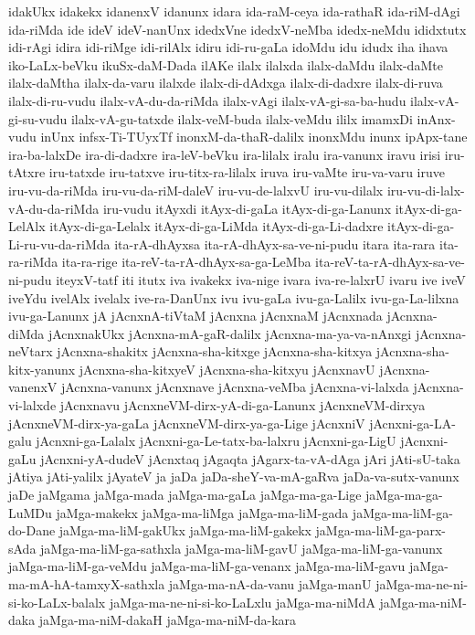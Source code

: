 {idakUkx
idakekx
idanenxV
idanunx
idara
ida-raM-ceya
ida-rathaR
ida-riM-dAgi
ida-riMda
ide
ideV
ideV-nanUnx
idedxVne
idedxV-neMba
idedx-neMdu
ididxtutx
idi-rAgi
idira
idi-riMge
idi-rilAlx
idiru
idi-ru-gaLa
idoMdu
idu
idudx
iha
ihava
iko-LaLx-beVku
ikuSx-daM-Dada
ilAKe
ilalx
ilalxda
ilalx-daMdu
ilalx-daMte
ilalx-daMtha
ilalx-da-varu
ilalxde
ilalx-di-dAdxga
ilalx-di-dadxre
ilalx-di-ruva
ilalx-di-ru-vudu
ilalx-vA-du-da-riMda
ilalx-vAgi
ilalx-vA-gi-sa-ba-hudu
ilalx-vA-gi-su-vudu
ilalx-vA-gu-tatxde
ilalx-veM-buda
ilalx-veMdu
ililx
imamxDi
inAnx-vudu
inUnx
infsx-Ti-TUyxTf
inonxM-da-thaR-dalilx
inonxMdu
inunx
ipApx-tane
ira-ba-lalxDe
ira-di-dadxre
ira-leV-beVku
ira-lilalx
iralu
ira-vanunx
iravu
irisi
iru-tAtxre
iru-tatxde
iru-tatxve
iru-titx-ra-lilalx
iruva
iru-vaMte
iru-va-varu
iruve
iru-vu-da-riMda
iru-vu-da-riM-daleV
iru-vu-de-lalxvU
iru-vu-dilalx
iru-vu-di-lalx-vA-du-da-riMda
iru-vudu
itAyxdi
itAyx-di-gaLa
itAyx-di-ga-Lanunx
itAyx-di-ga-LelAlx
itAyx-di-ga-Lelalx
itAyx-di-ga-LiMda
itAyx-di-ga-Li-dadxre
itAyx-di-ga-Li-ru-vu-da-riMda
ita-rA-dhAyxsa
ita-rA-dhAyx-sa-ve-ni-pudu
itara
ita-rara
ita-ra-riMda
ita-ra-rige
ita-reV-ta-rA-dhAyx-sa-ga-LeMba
ita-reV-ta-rA-dhAyx-sa-ve-ni-pudu
iteyxV-tatf
iti
itutx
iva
ivakekx
iva-nige
ivara
iva-re-lalxrU
ivaru
ive
iveV
iveYdu
ivelAlx
ivelalx
ive-ra-DanUnx
ivu
ivu-gaLa
ivu-ga-Lalilx
ivu-ga-La-lilxna
ivu-ga-Lanunx
jA
jAcnxnA-tiVtaM
jAcnxna
jAcnxnaM
jAcnxnada
jAcnxna-diMda
jAcnxnakUkx
jAcnxna-mA-gaR-dalilx
jAcnxna-ma-ya-va-nAnxgi
jAcnxna-neVtarx
jAcnxna-shakitx
jAcnxna-sha-kitxge
jAcnxna-sha-kitxya
jAcnxna-sha-kitx-yanunx
jAcnxna-sha-kitxyeV
jAcnxna-sha-kitxyu
jAcnxnavU
jAcnxna-vanenxV
jAcnxna-vanunx
jAcnxnave
jAcnxna-veMba
jAcnxna-vi-lalxda
jAcnxna-vi-lalxde
jAcnxnavu
jAcnxneVM-dirx-yA-di-ga-Lanunx
jAcnxneVM-dirxya
jAcnxneVM-dirx-ya-gaLa
jAcnxneVM-dirx-ya-ga-Lige
jAcnxniV
jAcnxni-ga-LA-galu
jAcnxni-ga-Lalalx
jAcnxni-ga-Le-tatx-ba-lalxru
jAcnxni-ga-LigU
jAcnxni-gaLu
jAcnxni-yA-dudeV
jAcnxtaq
jAgaqta
jAgarx-ta-vA-dAga
jAri
jAti-sU-taka
jAtiya
jAti-yalilx
jAyateV
ja
jaDa
jaDa-sheY-va-mA-gaRva
jaDa-va-sutx-vanunx
jaDe
jaMgama
jaMga-mada
jaMga-ma-gaLa
jaMga-ma-ga-Lige
jaMga-ma-ga-LuMDu
jaMga-makekx
jaMga-ma-liMga
jaMga-ma-liM-gada
jaMga-ma-liM-ga-do-Dane
jaMga-ma-liM-gakUkx
jaMga-ma-liM-gakekx
jaMga-ma-liM-ga-parx-sAda
jaMga-ma-liM-ga-sathxla
jaMga-ma-liM-gavU
jaMga-ma-liM-ga-vanunx
jaMga-ma-liM-ga-veMdu
jaMga-ma-liM-ga-venanx
jaMga-ma-liM-gavu
jaMga-ma-mA-hA-tamxyX-sathxla
jaMga-ma-nA-da-vanu
jaMga-manU
jaMga-ma-ne-ni-si-ko-LaLx-balalx
jaMga-ma-ne-ni-si-ko-LaLxlu
jaMga-ma-niMdA
jaMga-ma-niM-daka
jaMga-ma-niM-dakaH
jaMga-ma-niM-da-kara
}
